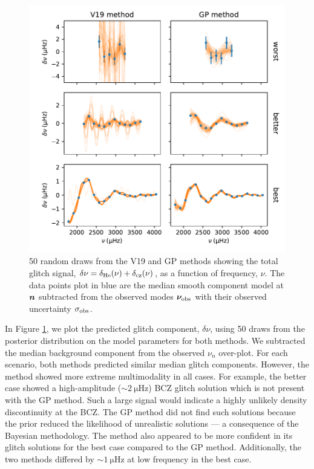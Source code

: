 \begin{figure}[!tbp]
    \centering
    \includegraphics{figures/glitch-test-signal.pdf}
    \caption{50 random draws from the V19 and GP methods showing the total glitch signal, \(\delta\nu = \delta_{{\mathrm{He}}}(\nu) + \delta_{{\mathrm{cz}}}(\nu)\), as a function of frequency, \(\nu\). The data points plot in blue are the median smooth component model at \(\bm{n}\) subtracted from the observed modes \(\bm{\nu}_{{\mathrm{obs}}}\) with their observed uncertainty \(\sigma_{{\mathrm{obs}}}\).}
    \label{fig:glitch-test-signal}
\end{figure}

In Figure \ref{fig:glitch-test-signal}, we plot the predicted glitch component, \(\delta\nu\), using 50 draws from the posterior distribution on the model parameters for both methods. We subtracted the median background component from the observed \(\nu_n\) over-plot. For each scenario, both methods predicted similar median glitch components. However, the  method showed more extreme multimodality in all cases. For example, the better case showed a high-amplitude (\(\sim \SI{2}{\micro\hertz}\)) BCZ glitch solution which is not present with the GP method. Such a large signal would indicate a highly unlikely density discontinuity at the BCZ. The GP method did not find such solutions because the prior reduced the likelihood of unrealistic solutions --- a consequence of the Bayesian methodology. The  method also appeared to be more confident in its glitch solutions for the best case compared to the GP method. Additionally, the two methods differed by \(\sim \SI{1}{\micro\hertz}\) at low frequency in the best case.

